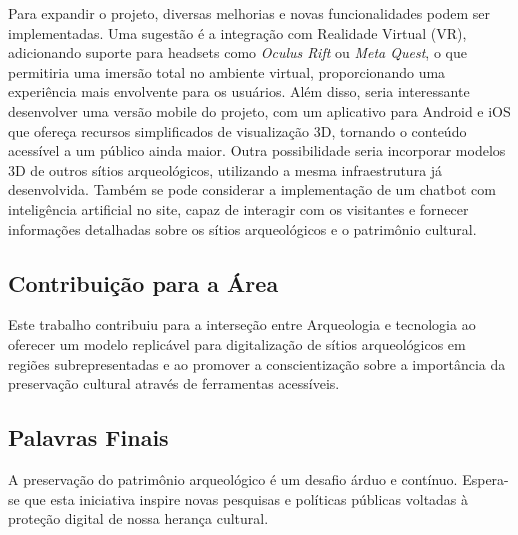 Para expandir o projeto, diversas melhorias e novas funcionalidades podem ser implementadas. Uma sugestão é a integração com Realidade Virtual (VR), adicionando suporte para headsets como \textit{Oculus Rift} ou \textit{Meta Quest}, o que permitiria uma imersão total no ambiente virtual, proporcionando uma experiência mais envolvente para os usuários. Além disso, seria interessante desenvolver uma versão mobile do projeto, com um aplicativo para Android e iOS que ofereça recursos simplificados de visualização 3D, tornando o conteúdo acessível a um público ainda maior.
Outra possibilidade seria incorporar modelos 3D de outros sítios arqueológicos, utilizando a mesma infraestrutura já desenvolvida. Também se pode considerar a implementação de um chatbot com inteligência artificial no site, capaz de interagir com os visitantes e fornecer informações detalhadas sobre os sítios arqueológicos e o patrimônio cultural.


\subsection{Contribuição para a Área}
Este trabalho contribuiu para a interseção entre Arqueologia e tecnologia ao oferecer um modelo replicável para digitalização de sítios arqueológicos em regiões subrepresentadas e ao promover a conscientização sobre a importância da preservação cultural através de ferramentas acessíveis.

\subsection{Palavras Finais}
A preservação do patrimônio arqueológico é um desafio árduo e contínuo. Espera-se que esta iniciativa inspire novas pesquisas e políticas públicas voltadas à proteção digital de nossa herança cultural. 